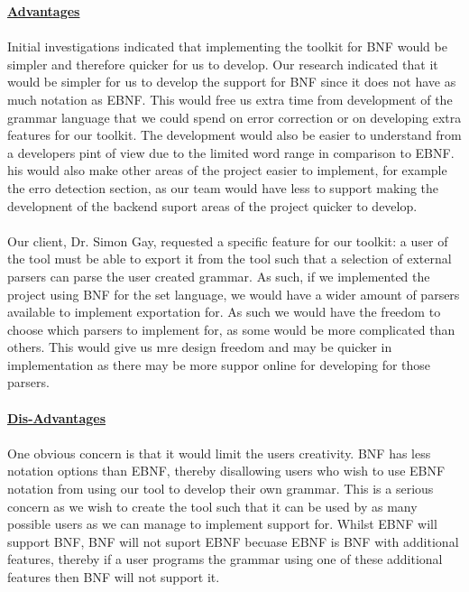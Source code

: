 \documentclass{l3proj}
\begin{document}
\textbf {\underline{Advantages}}\\
\\
 Initial investigations indicated that implementing the toolkit for BNF would be simpler and therefore quicker for us to develop. Our research indicated that it would be simpler for us to develop the support for BNF since it does not have as much notation as EBNF. This would free us extra time from development of the grammar language that we could spend on error correction or on developing extra features for our toolkit. The development would also be easier to understand from a developers pint of view due to the limited word range in comparison to EBNF. his would also make other areas of the project easier to implement, for example the erro detection section, as our team would have less to support making the developnent of the backend suport areas of the project quicker to develop. \\
\\
Our client, Dr. Simon Gay, requested a specific feature for our toolkit: a user of the tool must be able to export it from the tool such that a selection of external parsers can parse the user created grammar. As such, if we implemented the project using BNF for the set language, we would have a wider amount of parsers available to implement exportation for. As such we would have the freedom to choose which parsers to implement for, as some would be more complicated than others. This would give us mre design freedom and may be quicker in implementation as there may be more suppor online for developing for those parsers.\\
\\
\textbf {\underline{Dis-Advantages}}\\
\\
One obvious concern is that it would limit the users creativity. BNF has less notation options than EBNF, thereby disallowing users who wish to use EBNF notation from using our tool to develop their own grammar. This is a serious concern as we wish to create the tool such that it can be used by as many possible users as we can manage to implement support for. Whilst EBNF will support BNF, BNF will not suport EBNF becuase EBNF is BNF with additional features, thereby if a user programs the grammar using one of these additional features then BNF will not support it.\\
\\
\end{document}
